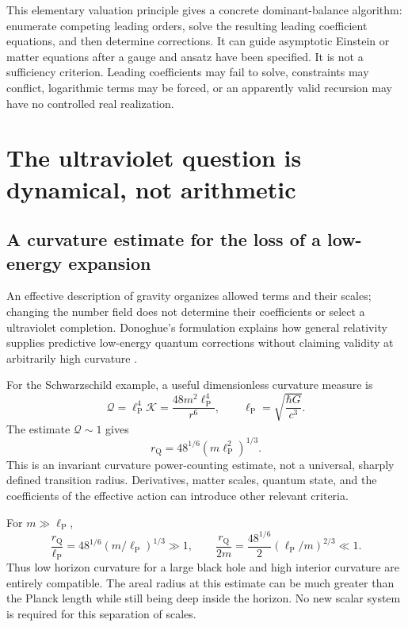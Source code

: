 \documentclass[11pt,a4paper]{article}
\numberwithin{equation}{section}
\theoremstyle{definition}
\theoremstyle{remark}
\newcommand{\lp}{\ell_{\mathrm P}}
\newcommand{\Krets}{\mathcal K}
\begin{document}
This elementary valuation principle gives a concrete dominant-balance algorithm: enumerate competing leading orders, solve the resulting leading coefficient equations, and then determine corrections. It can guide asymptotic Einstein or matter equations after a gauge and ansatz have been specified. It is not a sufficiency criterion. Leading coefficients may fail to solve, constraints may conflict, logarithmic terms may be forced, or an apparently valid recursion may have no controlled real realization.

\section{The ultraviolet question is dynamical, not arithmetic}
\label{sec:eft}

\subsection{A curvature estimate for the loss of a low-energy expansion}
An effective description of gravity organizes allowed terms and their scales; changing the number field does not determine their coefficients or select a ultraviolet completion. Donoghue's formulation explains how general relativity supplies predictive low-energy quantum corrections without claiming validity at arbitrarily high curvature \cite{Donoghue}.

For the Schwarzschild example, a useful dimensionless curvature measure is
\begin{equation}
 \mathcal Q=\lp^4\Krets=\frac{48m^2\lp^4}{r^6},\qquad
 \lp=\sqrt{\frac{\hbar G}{c^3}}.
\end{equation}
The estimate $\mathcal Q\sim1$ gives
\begin{equation}\label{eq:quantumradius}
 r_{\mathrm Q}=48^{1/6}(m\lp^2)^{1/3}.
\end{equation}
This is an invariant curvature power-counting estimate, not a universal, sharply defined transition radius. Derivatives, matter scales, quantum state, and the coefficients of the effective action can introduce other relevant criteria.

For $m\gg\lp$,
\begin{equation}
 \frac{r_{\mathrm Q}}{\lp}=48^{1/6}(m/\lp)^{1/3}\gg1,
 \qquad
 \frac{r_{\mathrm Q}}{2m}
 =\frac{48^{1/6}}2(\lp/m)^{2/3}\ll1.
\end{equation}
Thus low horizon curvature for a large black hole and high interior curvature are entirely compatible. The areal radius at this estimate can be much greater than the Planck length while still being deep inside the horizon. No new scalar system is required for this separation of scales.
\end{document}

